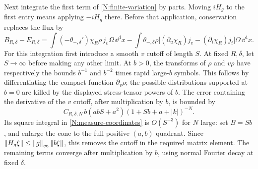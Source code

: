 Next integrate the first term of \eqref{N:finite-variation} by parts.
Moving $iH_g$ to the first entry means applying $-iH_g$ there.  Before
that application, conservation replaces the flux by
\begin{equation}\label{N:boundary-cap}
 B_{R,\delta}-E_{R,\delta}
 =\int(-\theta_{-,\delta}')\chi_R\rho\,j_v\Omega\,\dd^4x
 -\int\theta_{-,\delta}\rho
   \bigl[(\partial_u\chi_R)j_v-(\partial_i\chi_R)j_i\bigr]
       \Omega\,\dd^4x.
\end{equation}
For this integration first introduce a smooth $v$ cutoff of length
$S$.  At fixed $R,\delta$, let $S\to\infty$ before making any other
limit.  At $b>0$, the transforms of $\rho$ and $v\rho$ have respectively
the bounds $b^{-1}$ and $b^{-2}$ times rapid large-$b$ symbols.  This
follows by differentiating the compact function $\partial_v\rho$;
the possible distributions supported at $b=0$ are killed by the
displayed stress-tensor powers of $b$.  The error containing the
derivative of the $v$ cutoff, after multiplication by $b$, is bounded
by
\[
 C_{R,\delta,N}\,b(abS+a^2)(1+Sb+a+|k|)^{-N}.
\]
Its square integral in \eqref{N:measure-coordinates} is $O(S^{-3})$
for $N$ large: set $B=Sb$, and enlarge the cone to the full positive
$(a,b)$ quadrant.  Since $\left\lVert H_g\xi\right\rVert\leq
\left\lVert g\right\rVert_\infty\left\lVert b\xi\right\rVert$, this removes the cutoff in the required
matrix element.  The remaining terms converge after multiplication
by $b$, using normal Fourier decay at fixed $\delta$.

